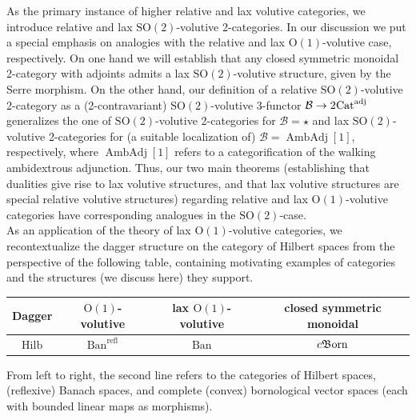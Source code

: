 \documentclass{article}
\newcommand{\Cat}{\operatorname{Cat}}%
\newcommand{\Ban}{\operatorname{Ban}}%
\newcommand{\Hilb}{\operatorname{Hilb}}%
\newcommand{\cBorn}{c\mathfrak{B}\hspace{-0.05cm}\operatorname{orn}}%
\newcommand{\refl}{\operatorname{refl}}%
\newcommand{\AmAdj}{\operatorname{AmbAdj}}%
\newcommand{\Oone}{\operatorname{O(1)}}
\newcommand{\Sotwo}{\operatorname{SO(2)}}
\newcommand{\B}{\mathcal{B}}
\numberwithin{equation}{section}
\theoremstyle{definition}
\theoremstyle{theorem}
\begin{document}
As the primary instance of higher relative and lax volutive categories, we introduce relative and lax $\Sotwo$-volutive 2-categories. In our discussion we put 
a special emphasis on analogies with the relative and lax $\Oone$-volutive case, respectively. On one hand we will establish that any closed symmetric monoidal
2-category with adjoints admits a lax $\Sotwo$-volutive structure, given by the Serre morphism. On the other hand, our definition of a relative $\Sotwo$-volutive 
2-category as a (2-contravariant) $\Sotwo$-volutive 3-functor $\B \to 2\hspace{-0.05cm}\Cat^{\operatorname{adj}}$ generalizes the one of $\Sotwo$-volutive 
2-categories for $\B = \star$ and lax $\Sotwo$-volutive 2-categories for (a suitable localization of) $\B = \AmAdj[1]$, respectively, where $\AmAdj[1]$ refers to a categorification 
of the walking ambidextrous adjunction. Thus, our two main theorems (establishing that dualities give rise to lax volutive structures, and that lax volutive structures are special relative volutive 
structures) regarding relative and lax $\Oone$-volutive categories have corresponding analogues in the $\Sotwo$-case.\\

As an application of the theory of lax $\Oone$-volutive categories, we recontextualize the dagger structure on the category of Hilbert spaces from the perspective
of the following table, containing motivating examples of categories and the structures (we discuss here) they support.
\begin{center}
\begin{tabular}{c|c|c|c} 
 Dagger & $\Oone$-volutive & lax $\Oone$-volutive & closed symmetric monoidal \\ 
  \hline
 $\Hilb$ & $\Ban^{\refl}$ & $\Ban$ & $\cBorn$ \\
\end{tabular}
\end{center}
From left to right, the second line refers to the categories of Hilbert spaces, (reflexive) Banach spaces, and complete (convex) bornological vector spaces (each 
with bounded linear maps as morphisms). \\
\end{document}
